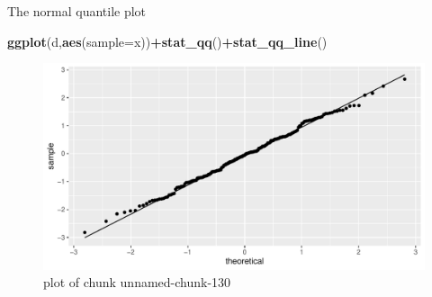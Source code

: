\documentclass[ignorenonframetext,]{beamer}
\newenvironment{Shaded}{\begin{snugshade}}{\end{snugshade}}
\newcommand{\DataTypeTok}[1]{\textcolor[rgb]{0.13,0.29,0.53}{#1}}
\newcommand{\KeywordTok}[1]{\textcolor[rgb]{0.13,0.29,0.53}{\textbf{#1}}}
\newcommand{\NormalTok}[1]{#1}
\newcommand{\OperatorTok}[1]{\textcolor[rgb]{0.81,0.36,0.00}{\textbf{#1}}}
\begin{document}
\begin{frame}[fragile]{The normal quantile plot}
\protect\hypertarget{the-normal-quantile-plot-1}{}

\begin{Shaded}
\begin{Highlighting}[]
\KeywordTok{ggplot}\NormalTok{(d,}\KeywordTok{aes}\NormalTok{(}\DataTypeTok{sample=}\NormalTok{x))}\OperatorTok{+}\KeywordTok{stat_qq}\NormalTok{()}\OperatorTok{+}\KeywordTok{stat_qq_line}\NormalTok{()}
\end{Highlighting}
\end{Shaded}

\begin{figure}
\centering
\includegraphics{figure/unnamed-chunk-130-1.pdf}
\caption{plot of chunk unnamed-chunk-130}
\end{figure}

\end{frame}
\end{document}
